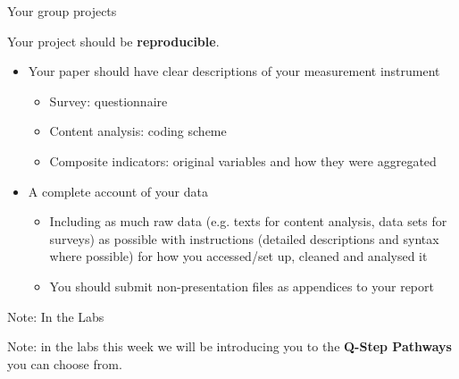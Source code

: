 \documentclass[10pt]{beamer}
\begin{document}
\begin{frame}{Your group projects}

    Your project should be \textbf{reproducible}.

    \begin{itemize}
        \item Your paper should have clear descriptions of your measurement instrument
        \begin{itemize}
            \item Survey: questionnaire
            \item Content analysis: coding scheme
            \item Composite indicators: original variables and how they were aggregated
        \end{itemize}

        \item A complete account of your data
        \begin{itemize}
            \item Including as much raw data (e.g. texts for content analysis, data sets for surveys) as possible with instructions (detailed descriptions and syntax where possible) for how you accessed/set up, cleaned and analysed it
            \item You should submit non-presentation files as appendices to your report
        \end{itemize}

    \end{itemize}

\end{frame}

\begin{frame}{Note: In the Labs}
    \begin{center}
        Note: in the labs this week we will be introducing you to the {\large{\textbf{Q-Step Pathways}}} you can choose from.
    \end{center}
\end{frame}
\end{document}
